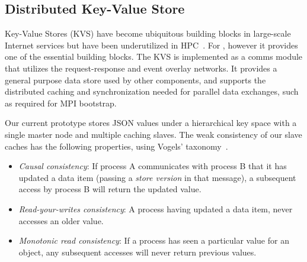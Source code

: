 \subsection{Distributed Key-Value Store}

Key-Value Stores (KVS) have become ubiquitous building blocks in large-scale
Internet services but have been underutilized in HPC~\cite{Wang:2013:USE:2503210.2503239}.
For \flux, however it provides one of the
essential building blocks.
The \flux KVS is implemented as a comms module that utilizes the
request-response and event overlay networks.  It provides a general
purpose data store used by other \flux components, and supports
the distributed caching and synchronization needed for parallel
data exchanges, such as required for MPI bootstrap.

%
%
Our current prototype stores JSON values under a hierarchical key space
with a single master node and multiple caching slaves.  The weak consistency
of our slave caches has the following properties, using Vogels'
taxonomy~\cite{Vogels:2009:EC:1435417.1435432}.

\begin{itemize}
\item{{\em Causal consistency}:  If process A communicates with process B
that it has updated a data item (passing a {\em store version} in that
message), a subsequent access by process B will return the updated value.}
\item{{\em Read-your-writes consistency}:  A process having updated a
data item, never accesses an older value.}
\item{{\em Monotonic read consistency}:  If a process has seen a particular
value for an object, any subsequent accesses will never return previous values.}
\end{itemize}

